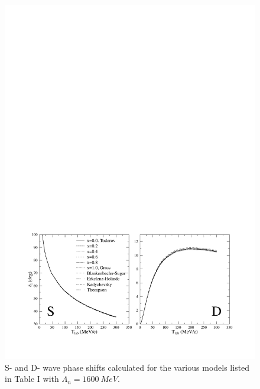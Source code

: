 \documentclass[mythesis.tex]{subfiles}
\begin{document}
\begin{figure}
\centerline{\includegraphics[width=5.5in]{graphics/phase_coup.pdf}}
\caption{S- and D- wave phase shifts calculated for the various
models listed in Table I with
$\Lambda_n=1600~MeV$.}\label{QPphases}

\end{figure}
\end{document}
